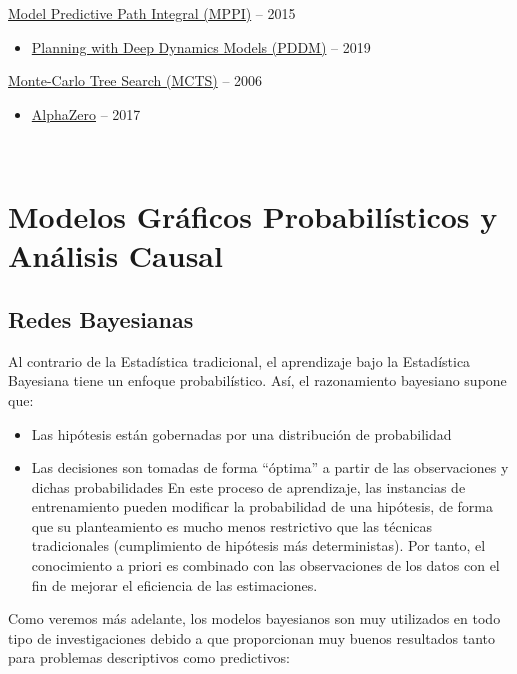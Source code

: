 \documentclass[
  a4paper,
  DIV=11,
  numbers=noendperiod]{scrreprt}
\providecommand{\tightlist}{%
  \setlength{\itemsep}{0pt}\setlength{\parskip}{0pt}}\usepackage{longtable,booktabs,array}
\begin{document}
\href{https://arxiv.org/abs/1509.01149}{Model Predictive Path Integral
(MPPI)} -- 2015

\begin{itemize}
\tightlist
\item
  \href{https://arxiv.org/abs/1909.11652}{Planning with Deep Dynamics
  Models (PDDM)} -- 2019
\end{itemize}

\href{https://hal.inria.fr/inria-00116992/document}{Monte-Carlo Tree
Search (MCTS)} -- 2006

\begin{itemize}
\tightlist
\item
  \href{https://arxiv.org/abs/1712.01815}{AlphaZero} -- 2017
\end{itemize}

~


\chapter{Modelos Gráficos Probabilísticos y Análisis
Causal}\label{modelos-gruxe1ficos-probabiluxedsticos-y-anuxe1lisis-causal}

\section{Redes Bayesianas}\label{redes-bayesianas}

Al contrario de la Estadística tradicional, el aprendizaje bajo la
Estadística Bayesiana tiene un enfoque probabilístico. Así, el
razonamiento bayesiano supone que:

\begin{itemize}
\tightlist
\item
  Las hipótesis están gobernadas por una distribución de probabilidad
\item
  Las decisiones son tomadas de forma ``óptima'' a partir de las
  observaciones y dichas probabilidades En este proceso de aprendizaje,
  las instancias de entrenamiento pueden modificar la probabilidad de
  una hipótesis, de forma que su planteamiento es mucho menos
  restrictivo que las técnicas tradicionales (cumplimiento de hipótesis
  más deterministas). Por tanto, el conocimiento a priori es combinado
  con las observaciones de los datos con el fin de mejorar el eficiencia
  de las estimaciones.
\end{itemize}

Como veremos más adelante, los modelos bayesianos son muy utilizados en
todo tipo de investigaciones debido a que proporcionan muy buenos
resultados tanto para problemas descriptivos como predictivos:
\end{document}
